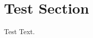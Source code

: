 \documentclass[uplatex,dvipdfmx,a4paper]{jsarticle}
\begin{document}
\section{Test Section}
Test Text.
\end{document}
